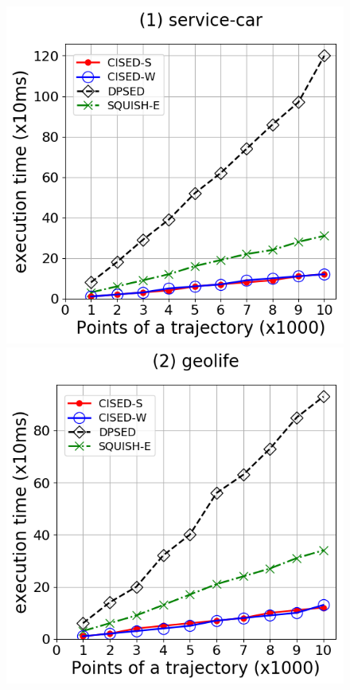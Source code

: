 {\begin{figure}[tb!]
\centering
\includegraphics[scale = 0.290]{Figures/Exp-time-size-service.png}\hspace{1ex}
\includegraphics[scale = 0.290]{Figures/Exp-time-size-geolife.png}\hspace{1ex}

\end{figure}}
